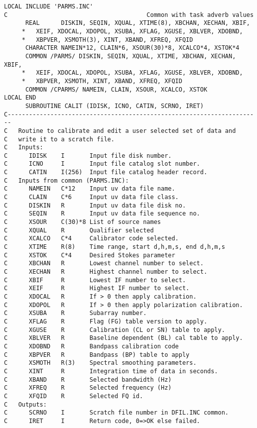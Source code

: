 \begin{verbatim}
LOCAL INCLUDE 'PARMS.INC'
C                                       Common with task adverb values
      REAL      DISKIN, SEQIN, XQUAL, XTIME(8), XBCHAN, XECHAN, XBIF,
     *   XEIF, XDOCAL, XDOPOL, XSUBA, XFLAG, XGUSE, XBLVER, XDOBND,
     *   XBPVER, XSMOTH(3), XINT, XBAND, XFREQ, XFQID
      CHARACTER NAMEIN*12, CLAIN*6, XSOUR(30)*8, XCALCO*4, XSTOK*4
      COMMON /PARMS/ DISKIN, SEQIN, XQUAL, XTIME, XBCHAN, XECHAN, XBIF,
     *   XEIF, XDOCAL, XDOPOL, XSUBA, XFLAG, XGUSE, XBLVER, XDOBND,
     *   XBPVER, XSMOTH, XINT, XBAND, XFREQ, XFQID
      COMMON /CPARMS/ NAMEIN, CLAIN, XSOUR, XCALCO, XSTOK
LOCAL END
      SUBROUTINE CALIT (IDISK, ICNO, CATIN, SCRNO, IRET)
C-----------------------------------------------------------------------
C   Routine to calibrate and edit a user selected set of data and
C   write it to a scratch file.
C   Inputs:
C      IDISK    I       Input file disk number.
C      ICNO     I       Input file catalog slot number.
C      CATIN    I(256)  Input file catalog header record.
C   Inputs from common (PARMS.INC):
C      NAMEIN   C*12    Input uv data file name.
C      CLAIN    C*6     Input uv data file class.
C      DISKIN   R       Input uv data file disk no.
C      SEQIN    R       Input uv data file sequence no.
C      XSOUR    C(30)*8 List of source names
C      XQUAL    R       Qualifier selected
C      XCALCO   C*4     Calibrator code selected.
C      XTIME    R(8)    Time range, start d,h,m,s, end d,h,m,s
C      XSTOK    C*4     Desired Stokes parameter
C      XBCHAN   R       Lowest channel number to select.
C      XECHAN   R       Highest channel number to select.
C      XBIF     R       Lowest IF number to select.
C      XEIF     R       Highest IF number to select.
C      XDOCAL   R       If > 0 then apply calibration.
C      XDOPOL   R       If > 0 then apply polarization calibration.
C      XSUBA    R       Subarray number.
C      XFLAG    R       Flag (FG) table version to apply.
C      XGUSE    R       Calibration (CL or SN) table to apply.
C      XBLVER   R       Baseline dependent (BL) cal table to apply.
C      XDOBND   R       Bandpass calibration code
C      XBPVER   R       Bandpass (BP) table to apply
C      XSMOTH   R(3)    Spectral smoothing parameters.
C      XINT     R       Integration time of data in seconds.
C      XBAND    R       Selected bandwidth (Hz)
C      XFREQ    R       Selected frequency (Hz)
C      XFQID    R       Selected FQ id.
C   Outputs:
C      SCRNO    I       Scratch file number in DFIL.INC common.
C      IRET     I       Return code, 0=>OK else failed.

\end{verbatim}
